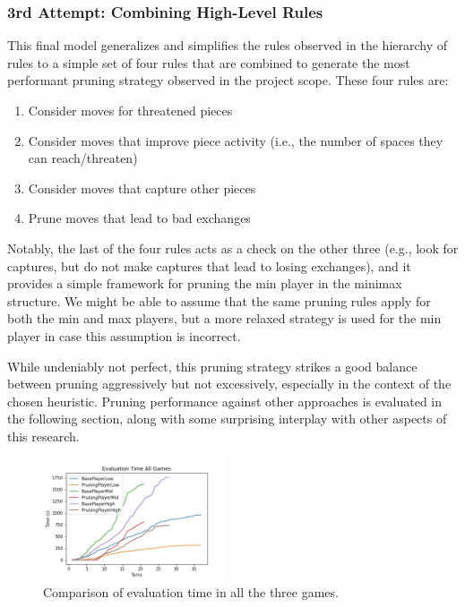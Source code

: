 \documentclass[letterpaper]{article}
\begin{document}
\subsubsection{3rd Attempt: Combining High-Level Rules}
This final model generalizes and simplifies the rules observed in the hierarchy of rules to a simple set of four rules that are combined to generate the most performant pruning strategy observed in the project scope.  These four rules are:
\begin{enumerate}
    \item Consider moves for threatened pieces
    \item Consider moves that improve piece activity (i.e., the number of spaces they can reach/threaten)
    \item Consider moves that capture other pieces
    \item Prune moves that lead to bad exchanges
\end{enumerate}
Notably, the last of the four rules acts as a check on the other three (e.g., look for captures, but do not make captures that lead to losing exchanges), and it provides a simple framework for pruning the min player in the minimax structure.  We might be able to assume that the same pruning rules apply for both the min and max players, but a more relaxed strategy is used for the min player in case this assumption is incorrect.

While undeniably not perfect, this pruning strategy strikes a good balance between pruning aggressively but not excessively, especially in the context of the chosen heuristic.  Pruning performance against other approaches is evaluated in the following section, along with some surprising interplay with other aspects of this research.

\begin{figure}
    \center

    \includegraphics[width=0.48\textwidth]{all_game_time.jpg}
  
    \caption{Comparison of evaluation time in all the three games.} 
\end{figure}
\end{document}
